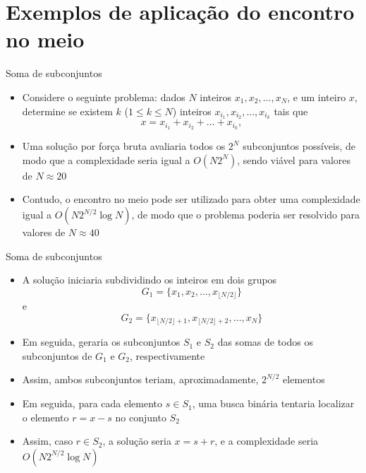 \section{Exemplos de aplicação do encontro no meio}

\begin{frame}[fragile]{Soma de subconjuntos}

    \begin{itemize}
        \item Considere o seguinte problema: dados $N$ inteiros $x_1, x_2, \ldots, x_N$, e um
            inteiro $x$, determine se existem $k$ ($1\leq k\leq N$) inteiros 
            $x_{i_1}, x_{i_2}, \ldots, x_{i_k}$ tais que
            \[
                x = x_{i_1} + x_{i_2} + \ldots + x_{i_k},
            \] 

        \item Uma solução por força bruta avaliaria todos os $2^N$ subconjuntos possíveis, de modo
            que a complexidade seria igual a $O(N2^N)$, sendo viável para valores de $N \approx 20$

        \item Contudo, o encontro no meio pode ser utilizado para obter uma complexidade
            igual a $O(N2^{N/2}\log N)$, de modo que o problema poderia ser resolvido para valores de
            $N\approx 40$
       
    \end{itemize}

\end{frame}

\begin{frame}[fragile]{Soma de subconjuntos}

    \begin{itemize}
        \item A solução iniciaria subdividindo os inteiros em dois grupos
        \[
            G_1 = \lbrace x_1, x_2, \ldots, x_{\lfloor N/2\rfloor}\rbrace
        \]
        e
        \[
            G_2 = \lbrace x_{\lfloor N/2\rfloor + 1}, x_{\lfloor N/2\rfloor + 2}, \ldots, x_{N}\rbrace
        \]

        \item Em seguida, geraria os subconjuntos $S_1$ e $S_2$ das somas de todos os subconjuntos de
            $G_1$ e $G_2$, respectivamente

        \item Assim, ambos subconjuntos teriam, aproximadamente, $2^{N/2}$ elementos

        \item Em seguida, para cada elemento $s\in S_1$, uma busca binária tentaria localizar o
            elemento $r = x - s$ no conjunto $S_2$

        \item Assim, caso $r\in S_2$, a solução seria $x = s + r$, e a complexidade seria
            $O(N2^{N/2}\log N)$
    \end{itemize}

\end{frame}

